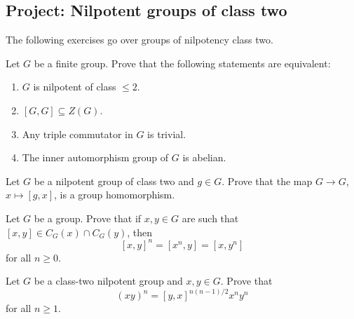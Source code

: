 \subsection{Project: Nilpotent groups of class two}

The following exercises go over groups 
of nilpotency class two. 

\begin{exercise}
    \label{xca:class2}
    Let $G$ be a finite group. Prove that the following statements are equivalent:
    \begin{enumerate}
        \item $G$ is nilpotent of class $\leq2$.
        \item $[G,G]\subseteq Z(G)$. 
        \item Any triple commutator in $G$ is trivial. 
        \item The inner automorphism group of $G$ is abelian. 
    \end{enumerate}
\end{exercise}

\begin{exercise}
    Let $G$ be a nilpotent group of class two and $g\in G$. Prove 
    that the map $G\to G$, $x\mapsto [g,x]$, is a group homomorphism. 
\end{exercise}

\begin{exercise}
\label{xca:commutador}
Let $G$ be a group. Prove that 
if $x,y\in G$ are such that $[x,y]\in C_G(x)\cap C_G(y)$, then 
\[
[x,y]^n=[x^n,y]=[x,y^n]
\]
for all $n\geq0$.
\end{exercise}


\begin{exercise}[Hall]
\label{xca:Hall}
Let $G$ be a class-two nilpotent group and 
$x,y\in G$. Prove that 
\[
(xy)^n=[y,x]^{n(n-1)/2}x^ny^n
\]
for all $n\geq1$.
\end{exercise}

